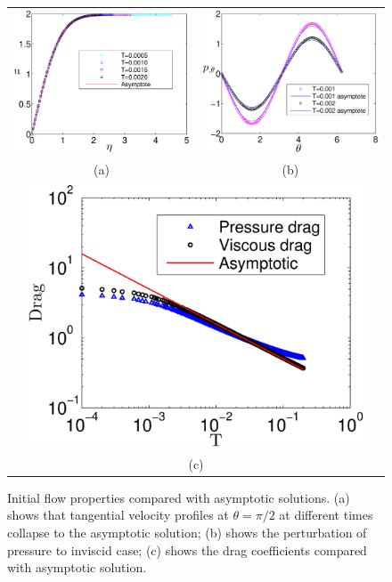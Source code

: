 \begin{figure}
\begin{center}
\begin{tabular}[t]{cc}
\includegraphics[width=6.5cm]{./Figures/u_asymptotic.eps} &
\includegraphics[width=6.5cm]{./Figures/p_asymptotic.eps} \\
(a) & (b) \\
\multicolumn{2}{c}{\includegraphics[width=10cm]{./Figures/InitialDrag.eps}} \\
\multicolumn{2}{c}{(c)}
\end{tabular}
\end{center}
 \caption[Initial flow properties compared with asymptotic solutions]{Initial flow properties compared with asymptotic solutions. (a) shows that tangential velocity profiles at $\theta = \pi/2$ at different times collapse to the asymptotic solution; (b) shows the perturbation of pressure to inviscid case; (c) shows the drag coefficients compared with asymptotic solution.}
 \label{fig:initialdrag}
\end{figure}



